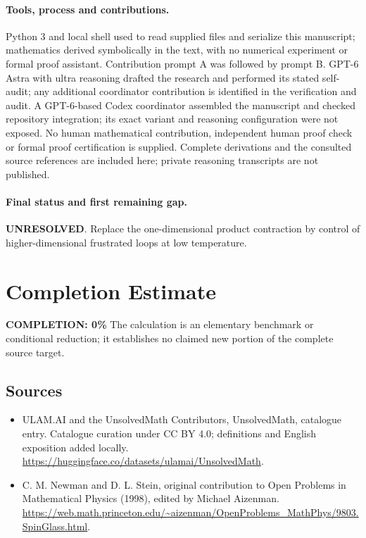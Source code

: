 \documentclass[11pt]{article}
\begin{document}
\paragraph{Tools, process and contributions.}
Python 3 and local shell used to read supplied files and serialize this manuscript; mathematics derived symbolically in the text, with no numerical experiment or formal proof assistant. Contribution prompt A was followed by prompt B. GPT-6 Astra with ultra reasoning drafted the research and performed its stated self-audit; any additional coordinator contribution is identified in the verification and audit. A GPT-6-based Codex coordinator assembled the manuscript and checked repository integration; its exact variant and reasoning configuration were not exposed. No human mathematical contribution, independent human proof check or formal proof certification is supplied. Complete derivations and the consulted source references are included here; private reasoning transcripts are not published.

\paragraph{Final status and first remaining gap.}
\textbf{UNRESOLVED}. Replace the one-dimensional product contraction by control of higher-dimensional frustrated loops at low temperature.

\section{Completion Estimate}
\noindent\textbf{COMPLETION: 0\%}
The calculation is an elementary benchmark or conditional reduction; it establishes no claimed new portion of the complete source target.

\subsection{Sources}
\begin{itemize}
\item[\hypertarget{source:statement:1}{S1}] ULAM.AI and the UnsolvedMath Contributors, UnsolvedMath, catalogue entry. Catalogue curation under CC BY 4.0; definitions and English exposition added locally.
\url{https://huggingface.co/datasets/ulamai/UnsolvedMath}.
\item[\hypertarget{source:statement:2}{S2}] C. M. Newman and D. L. Stein, original contribution to Open Problems in Mathematical Physics (1998), edited by Michael Aizenman.
\url{https://web.math.princeton.edu/~aizenman/OpenProblems_MathPhys/9803.SpinGlass.html}.
\end{itemize}
\label{end:statement}
\end{document}
